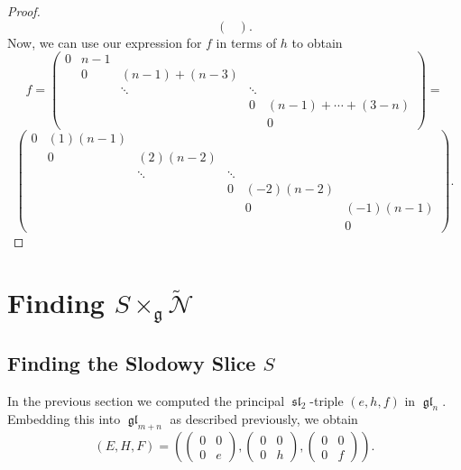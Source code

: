 \documentclass[12pt,psamsfonts]{article}
\DeclareMathOperator{\gl}{\mathfrak{gl}}
\DeclareMathOperator{\spl}{\mathfrak{sl}}
\begin{document}
\begin{proof}
\[\begin{pmatrix}
\end{pmatrix}.\]
Now, we can use our expression for \(f\) in terms of \(h\) to obtain
\[f = \begin{pmatrix}
    0 & n - 1 \\
    & 0 & (n - 1) + (n - 3) \\
    & & \ddots & \ddots \\
    & & & 0 & (n - 1) + \cdots + (3 - n) \\
    & & & & 0
\end{pmatrix} = \]
\[\begin{pmatrix}
    0 & (1) (n - 1) \\
      & 0 & (2) (n - 2) \\
      & & \ddots & \ddots & \\
    & & & 0 & (-2)(n - 2) \\
    & & & & 0 & (-1)(n - 1)\\
    & &  & & & 0
\end{pmatrix}.\]
\end{proof}

\section{Finding \texorpdfstring{\(S \times_\mathfrak{g} \widetilde{\mathcal{N}}\)}{S x\_g N}}\label{find_sxn}
\subsection{Finding the Slodowy Slice \texorpdfstring{\(S\)}{S}}
In the previous section we computed the principal \(\spl_2\)-triple \((e, h, f)\) in \(\gl_n\).
Embedding this into \(\gl_{m + n}\) as described previously, we obtain
\[(E, H, F) = \left(\begin{pmatrix}0 & 0 \\0 & e\end{pmatrix}, \begin{pmatrix}0 & 0 \\0 & h\end{pmatrix}, \begin{pmatrix}0 & 0 \\0 & f\end{pmatrix}\right).\]
\end{document}
